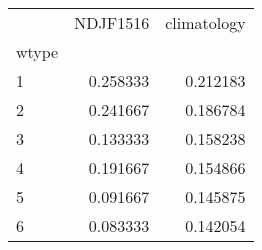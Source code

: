 \begin{tabular}{lrr}
\toprule
{} &  NDJF1516 &  climatology \\
wtype &           &              \\
\midrule
1     &  0.258333 &     0.212183 \\
2     &  0.241667 &     0.186784 \\
3     &  0.133333 &     0.158238 \\
4     &  0.191667 &     0.154866 \\
5     &  0.091667 &     0.145875 \\
6     &  0.083333 &     0.142054 \\
\bottomrule
\end{tabular}
